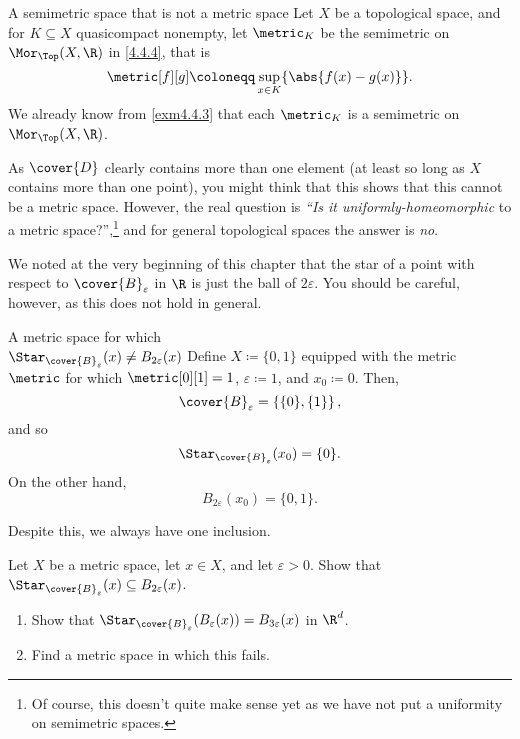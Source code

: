 \begin{exm}{A semimetric space that is not a metric space}{}
Let $X$ be a topological space, and for $K\subseteq X$ quasicompact nonempty, let $\metric _K$ be the semimetric on $\Mor _{\Top}(X,\R )$ in \eqref{4.4.4}, that is
\begin{equation}
\metric[f][g]\coloneqq \sup _{x\in K}\{ \abs{f(x)-g(x)}\} .
\end{equation}
We already know from \cref{exm4.4.3} that each $\metric _K$ is a semimetric on $\Mor _{\Top}(X,\R )$.

As $\cover{D}$ clearly contains more than one element (at least so long as $X$ contains more than one point), you might think that this shows that this cannot be a metric space.  However, the real question is \emph{``Is it uniformly-homeomorphic} to a metric space?'',\footnote{Of course, this doesn't quite make sense yet as we have not put a uniformity on semimetric spaces.} and for general topological spaces the answer is \emph{no}.
\end{exm}
We noted at the very beginning of this chapter that the star of a point with respect to $\cover{B}_{\varepsilon}$ in $\R$ is just the ball of $2\varepsilon$.  You should be careful, however, as this does not hold in general.
\begin{exm}{A metric space for which \\ $\Star _{\cover{B}_{\varepsilon}}(x)\neq B_{2\varepsilon}(x)$}{}
Define $X\coloneqq \{ 0,1\}$ equipped with the metric $\metric$ for which $\metric[0][1]=1$, $\varepsilon \coloneqq 1$, and $x_0\coloneqq 0$.  Then,
\begin{equation}
\cover{B}_{\varepsilon}=\left\{ \{ 0\} ,\{ 1\} \right\} ,
\end{equation}
and so
\begin{equation}
\Star _{\cover{B}_{\varepsilon}}(x_0)=\{ 0\} .
\end{equation}
On the other hand,
\begin{equation}
B_{2\varepsilon}(x_0)=\{ 0,1\} .
\end{equation}
\end{exm}
Despite this, we always have one inclusion.
\begin{exr}{}{}
Let $X$ be a metric space, let $x\in X$, and let $\varepsilon >0$.  Show that $\Star _{\cover{B}_{\varepsilon}}(x)\subseteq B_{2\varepsilon}(x)$.
\end{exr}
\begin{exr}{}{}
\begin{enumerate}
\item Show that $\Star _{\cover{B}_{\varepsilon}}(B_{\varepsilon}(x))=B_{3\varepsilon}(x)$ in $\R ^d$.
\item Find a metric space in which this fails.
\end{enumerate}
\end{exr}

